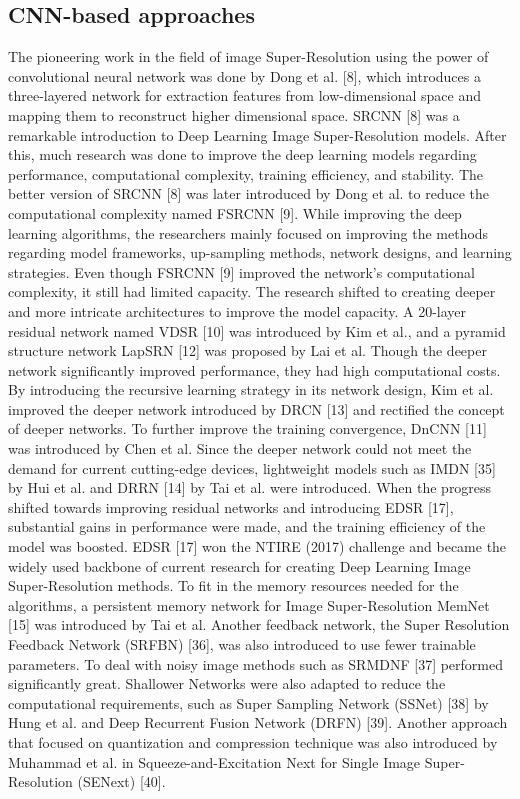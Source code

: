 \documentclass[twocolumn]{svjour3}          %
\begin{document}
\subsection{CNN-based approaches}
The pioneering work in the field of image Super-Resolution using the power of convolutional neural network was done by Dong et al. [8], which introduces a three-layered network for extraction features from low-dimensional space and mapping them to reconstruct higher dimensional space. SRCNN [8] was a remarkable introduction to Deep Learning Image Super-Resolution models. After this, much research was done to improve the deep learning models regarding performance, computational complexity, training efficiency, and stability. The better version of SRCNN [8] was later introduced by Dong et al. to reduce the computational complexity named FSRCNN [9]. While improving the deep learning algorithms, the researchers mainly focused on improving the methods regarding model frameworks, up-sampling methods, network designs, and learning strategies. Even though FSRCNN [9] improved the network's computational complexity, it still had limited capacity. The research shifted to creating deeper and more intricate architectures to improve the model capacity. A 20-layer residual network named VDSR [10] was introduced by Kim et al., and a pyramid structure network LapSRN [12] was proposed by Lai et al. Though the deeper network significantly improved performance, they had high computational costs. By introducing the recursive learning strategy in its network design, Kim et al. improved the deeper network introduced by DRCN [13] and rectified the concept of deeper networks. To further improve the training convergence, DnCNN [11] was introduced by Chen et al. Since the deeper network could not meet the demand for current cutting-edge devices, lightweight models such as IMDN [35] by Hui et al. and DRRN [14] by Tai et al. were introduced. When the progress shifted towards improving residual networks and introducing EDSR [17], substantial gains in performance were made, and the training efficiency of the model was boosted. EDSR [17] won the NTIRE (2017) challenge and became the widely used backbone of current research for creating Deep Learning Image Super-Resolution methods. To fit in the memory resources needed for the algorithms, a persistent memory network for Image Super-Resolution MemNet [15] was introduced by Tai et al. Another feedback network, the Super Resolution Feedback Network (SRFBN) [36], was also introduced to use fewer trainable parameters. To deal with noisy image methods such as SRMDNF [37] performed significantly great. Shallower Networks were also adapted to reduce the computational requirements, such as Super Sampling Network (SSNet) [38] by Hung et al. and Deep Recurrent Fusion Network (DRFN) [39]. Another approach that focused on quantization and compression technique was also introduced by Muhammad et al. in Squeeze-and-Excitation Next for Single Image Super-Resolution (SENext) [40].
\end{document}
